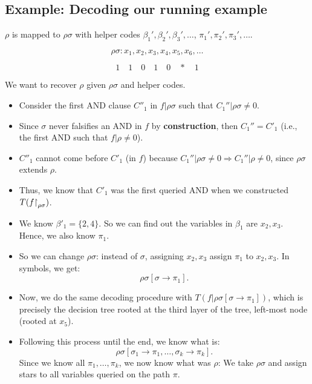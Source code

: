 \subsection*{Example: Decoding our running example}
\noindent
\( \rho \) is mapped to \( \rho{\sigma} \) with helper codes \( \beta_1', \beta_2', \beta_3', \dots \), \( \pi_1', \pi_2', \pi_3', \dots \).

\[
\rho{\sigma} : x_1, x_2, x_3, x_4, x_5, x_6, \dots
\]

\[
1 \quad 1 \quad 0 \quad 1 \quad 0 \quad * \quad 1
\]

\noindent
We want to recover \( \rho \) given \( \rho{\sigma} \) and helper codes.

\begin{itemize}
    \item Consider the first AND clause \( C''_1 \) in \( f | \rho{\sigma} \) such that \( C_1'' | \rho{\sigma} \neq 0 \).
    \item Since \( \sigma \) never falsifies an AND in \( f \) by \textbf{construction}, then \( C_1'' = C'_1 \) (i.e., the first AND such that \( f | \rho \neq 0 \)).
    \item \( C''_1 \) cannot come before \( C'_1 \) (in \( f \)) because \( C_1'' | \rho{\sigma} \neq 0 \Rightarrow C_1'' | \rho \neq 0 \), since \( \rho{\sigma} \) extends \( \rho \).
    \item Thus, we know that \( C'_1 \) was the first queried AND when we constructed \( T(f{\upharpoonright}_ {\rho\sigma}) \).
    \item We know \( \beta'_1 = \{ 2, 4 \} \). So we can find out the variables in $\beta_1$  are \( x_2, x_3 \). Hence, we also know \( \pi_1 \).
    \item So we can change \( \rho{\sigma} \): instead of \( \sigma \), assigning \( x_2, x_3 \) assign \( \pi_1 \) to \( x_2, x_3 \). In symbols, we get:
    \[
    \rho{\sigma} [\sigma \to \pi_1].
    \]
    \item Now, we do the same decoding procedure with \( T(f | \rho{\sigma} [\sigma \to \pi_1]) \), which is precisely the decision tree rooted at the third layer of the tree, left-most node (rooted at $x_5$).
    \item Following this process until the end, we know what is:
    \[
    \rho{\sigma} [\sigma_1 \to \pi_1, \dots, \sigma_k \to \pi_k].
    \]
    Since we know all \( \pi_1, \dots, \pi_k \), we now know what was \( \rho \): We take \( \rho{\sigma} \) and assign stars to all variables queried on the path \( \pi \).
\end{itemize}

